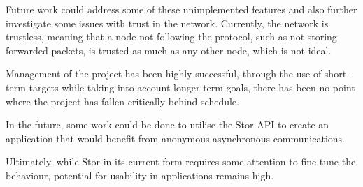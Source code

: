 		Future work could address some of these unimplemented features and also further investigate some issues with trust in the network. Currently, the network is trustless, meaning that a node not following the protocol, such as not storing forwarded packets, is trusted as much as any other node, which is not ideal.
		
		Management of the project has been highly successful, through the use of short-term targets while taking into account longer-term goals, there has been no point where the project has fallen critically behind schedule.

		In the future, some work could be done to utilise the Stor API to create an application that would benefit from anonymous asynchronous communications.
		
		Ultimately, while Stor in its current form requires some attention to fine-tune the behaviour, potential for usability in applications remains high.